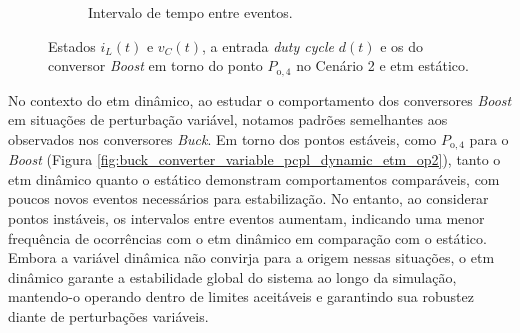 \begin{figure}[H]
\begin{subfigure}{1.\textwidth}
    \caption{Intervalo de tempo entre eventos.}
    \label{fig:boost_converter_variable_pcpl_static_etm_op2_duty_c}
  \end{subfigure}
  \caption{Estados $i_L(t)$ e $v_C(t)$, a entrada \textit{duty cycle} $d(t)$ e os  do conversor \textit{Boost }em torno do ponto $P_{\mathrm{o}, 4}$ no Cenário 2 e \acrshort{etm} estático.}
\end{figure}

No contexto do \acrshort{etm} dinâmico, ao estudar o comportamento dos conversores \textit{Boost }em situações de perturbação variável, notamos padrões semelhantes aos observados nos conversores \textit{Buck}. Em torno dos pontos estáveis, como $P_{\mathrm{o}, 4}$ para o \textit{Boost }(Figura \ref{fig:buck_converter_variable_pcpl_dynamic_etm_op2}), tanto o \acrshort{etm} dinâmico quanto o estático demonstram comportamentos comparáveis, com poucos novos eventos necessários para estabilização. No entanto, ao considerar pontos instáveis, os intervalos entre eventos aumentam, indicando uma menor frequência de ocorrências com o \acrshort{etm} dinâmico em comparação com o estático. Embora a variável dinâmica não convirja para a origem nessas situações, o \acrshort{etm} dinâmico garante a estabilidade global do sistema ao longo da simulação, mantendo-o operando dentro de limites aceitáveis e garantindo sua robustez diante de perturbações variáveis.

